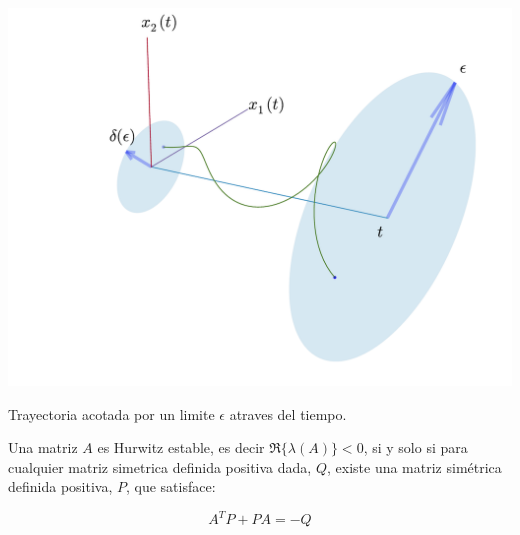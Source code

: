         \begin{marginfigure}
            \centering
            \includegraphics[width=\textwidth]{./imagenes/trayectoriaacotada3d.pdf}
            \caption{\label{fig:trayectoriaestable3d}Trayectoria acotada por un limite $\epsilon$ atraves del tiempo.}
        \end{marginfigure}

        \begin{teorema} \label{te:lyap1}
            Una matriz $A$ es Hurwitz estable, es decir $\Re{\{ \lambda(A) \}} < 0$, si y solo si para cualquier matriz simetrica definida positiva dada, $Q$, existe una matriz simétrica definida positiva, $P$, que satisface:

            \begin{equation}
                A^T P + P A = -Q
            \end{equation}
        \end{teorema}


